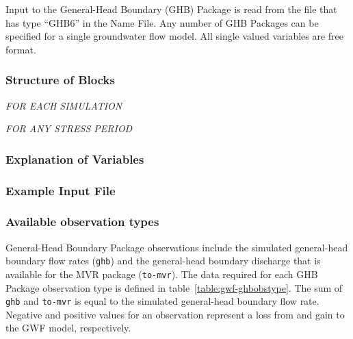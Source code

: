 Input to the General-Head Boundary (GHB) Package is read from the file that has type ``GHB6'' in the Name File.  Any number of GHB Packages can be specified for a single groundwater flow model.  All single valued variables are free format.

\vspace{5mm}
\subsubsection{Structure of Blocks}
\vspace{5mm}

\noindent \textit{FOR EACH SIMULATION}


\vspace{5mm}
\noindent \textit{FOR ANY STRESS PERIOD}


\vspace{5mm}
\subsubsection{Explanation of Variables}
\begin{description}

\end{description}

\vspace{5mm}
\subsubsection{Example Input File}


\vspace{5mm}
\subsubsection{Available observation types}
General-Head Boundary Package observations include the simulated general-head boundary flow rates (\texttt{ghb}) and the general-head boundary discharge that is available for the MVR package (\texttt{to-mvr}). The data required for each GHB Package observation type is defined in table~\ref{table:gwf-ghbobstype}. The sum of \texttt{ghb} and \texttt{to-mvr} is equal to the simulated general-head boundary flow rate. Negative and positive values for an observation represent a loss from and gain to the GWF model, respectively.

